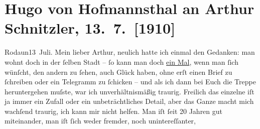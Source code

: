 

         
         \renewcommand{\erwaehntePersonen}{Personen: Richard Beer-Hofmann, Rose Friedmann, Louis Philipp Friedmann, Olga Schnitzler, Heinrich Schnitzler, Lilly Schnitzler}
         \renewcommand{\erwaehnteOrte}{Orte: Arlberg, Bad Aussee, Bodensee, Canazei, Grand Hotel Excelsior, Hofmannsthal-Schlössl, Lido, München, Rodaun, Tirol, Welsberg-Taisten, Wien}
         \renewcommand{\erwaehnteWerke}{Werke: Cristinas Heimreise. Komödie, Der Rosenkavalier}
               \section[Hugo von Hofmannsthal an Arthur Schnitzler, 13. 7. {[}1910{]}]{ Hugo von Hofmannsthal an Arthur Schnitzler, 13. 7. {[}1910{]}}\nopagebreak{}\rehead{ }\begin{ledgroupsized}[t]{13cm}\normalsize\beginnumbering \toendnotes[C]{\smallbreak\pagebreak[2]} 
\toendnotes[C]{\smallbreak}\pstart
           \raggedleft{}{\pb}Rodaun13 Juli.\pend
           \pstart{}Mein lieber Arthur, \pend\pstart
           neulich hatte ich einmal den Gedanken: man wohnt doch in der ſelben Stadt – ſo kann
               man doch \uline{ein Mal}, wenn man ſich wünſcht, den andern
               zu ſehen, auch Glück haben, ohne erſt einen Brief zu ſchreiben oder ein Telegramm zu
               ſchicken – und als ich dann bei Euch die Treppe heruntergehen {\pb}muſste, war ich unverhältnismäßig
               traurig. Freilich das einzelne iſt ja immer ein Zufall oder ein unbeträchtliches
               Detail, aber das Ganze macht mich wachſend traurig, ich kann mir nicht helfen. Man
               iſt ſeit 20 Jahren gut miteinander, man iſt ſich weder fremder, noch unintereſſanter,

\end{ledgroupsized}
